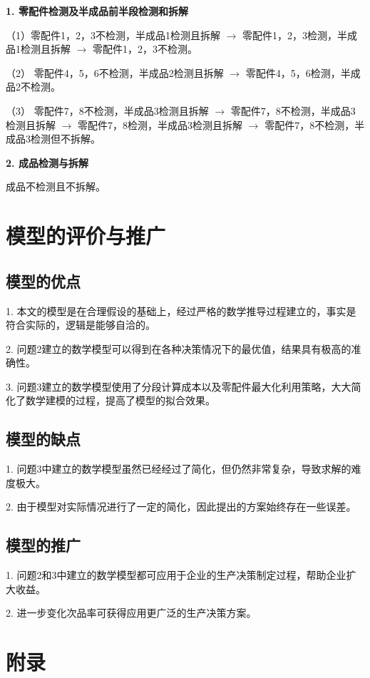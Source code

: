 \documentclass[withoutpreface,bwprint]{cumcmthesis} %
\begin{document}
\textbf{1. 零配件检测及半成品前半段检测和拆解}

（1）零配件1，2，3不检测，半成品1检测且拆解 $\rightarrow$ 零配件1，2，3检测，半成品1检测且拆解 $\rightarrow$ 零配件1，2，3不检测。

（2） 零配件4，5，6不检测，半成品2检测且拆解 $\rightarrow$ 零配件4，5，6检测，半成品2不检测。

（3） 零配件7，8不检测，半成品3检测且拆解 $\rightarrow$ 零配件7，8不检测，半成品3检测且拆解 $\rightarrow$ 零配件7，8检测，半成品3检测且拆解 $\rightarrow$ 零配件7，8不检测，半成品3检测但不拆解。

\textbf{2. 成品检测与拆解}

成品不检测且不拆解。

\section{模型的评价与推广}

\subsection{模型的优点}
1. 本文的模型是在合理假设的基础上，经过严格的数学推导过程建立的，事实是符合实际的，逻辑是能够自洽的。

2. 问题2建立的数学模型可以得到在各种决策情况下的最优值，结果具有极高的准确性。

3. 问题3建立的数学模型使用了分段计算成本以及零配件最大化利用策略，大大简化了数学建模的过程，提高了模型的拟合效果。

\subsection{模型的缺点}
1. 问题3中建立的数学模型虽然已经经过了简化，但仍然非常复杂，导致求解的难度极大。

2. 由于模型对实际情况进行了一定的简化，因此提出的方案始终存在一些误差。

\subsection{模型的推广}
1. 问题2和3中建立的数学模型都可应用于企业的生产决策制定过程，帮助企业扩大收益。

2. 进一步变化次品率可获得应用更广泛的生产决策方案。




\newpage
\appendix
\section*{附录}
\end{document}
